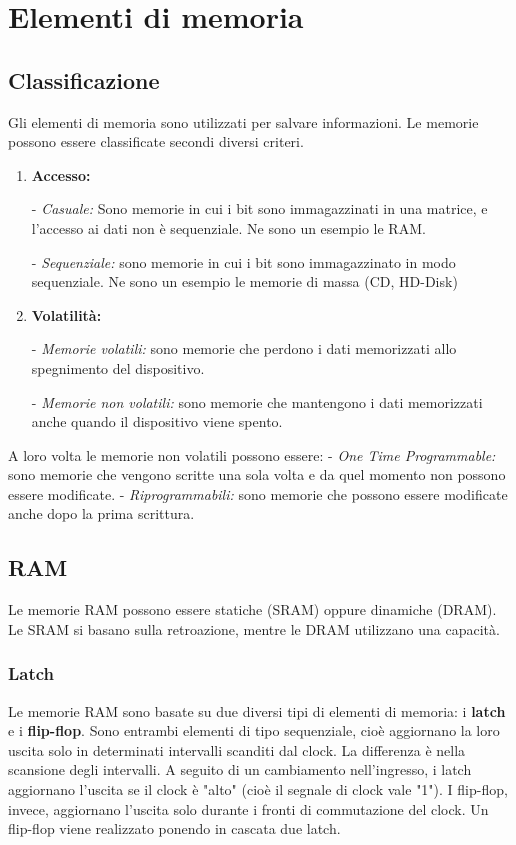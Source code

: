 \documentclass[\main/main.tex]{subfiles}
\begin{document}
\section{Elementi di memoria}
\subsection{Classificazione}
Gli elementi di memoria sono utilizzati per salvare informazioni.
Le memorie possono essere classificate secondi diversi criteri.
\begin{enumerate}
\item \textbf{Accesso:}

	- \textit{Casuale:} Sono memorie in cui i bit sono immagazzinati in una matrice, e l'accesso ai dati non è sequenziale. Ne sono un esempio le RAM. 
	
	- \textit{Sequenziale:} sono memorie in cui i bit sono immagazzinato in modo sequenziale. Ne sono un esempio le memorie di massa (CD, HD-Disk)
\item \textbf{Volatilità:}

	- \textit{Memorie volatili:} sono memorie che perdono i dati memorizzati allo spegnimento del dispositivo.
	
	- \textit{Memorie non volatili:} sono memorie che mantengono i dati memorizzati anche quando il dispositivo viene spento.
\end{enumerate}

A loro volta le memorie non volatili possono essere:
	- \textit{One Time Programmable:} sono memorie che vengono scritte una sola volta e da quel momento non possono essere modificate.
	- \textit{Riprogrammabili:} sono memorie che possono essere modificate anche dopo la prima scrittura.
	
\subsection{RAM}
Le memorie RAM possono essere statiche (SRAM) oppure dinamiche (DRAM). Le SRAM si basano sulla retroazione, mentre le DRAM utilizzano una capacità.

\subsubsection{Latch}
Le memorie RAM sono basate su due diversi tipi di elementi di memoria: i \textbf{latch} e i \textbf{flip-flop}.
Sono entrambi elementi di tipo sequenziale, cioè aggiornano la loro uscita solo in determinati intervalli scanditi dal clock. La differenza è nella scansione degli intervalli.
A seguito di un cambiamento nell'ingresso, i latch aggiornano l'uscita se il clock è "alto" (cioè il segnale di clock vale "1").
I flip-flop, invece, aggiornano l'uscita solo durante i fronti di commutazione del clock. 
Un flip-flop viene realizzato ponendo in cascata due latch. 
\end{document}
